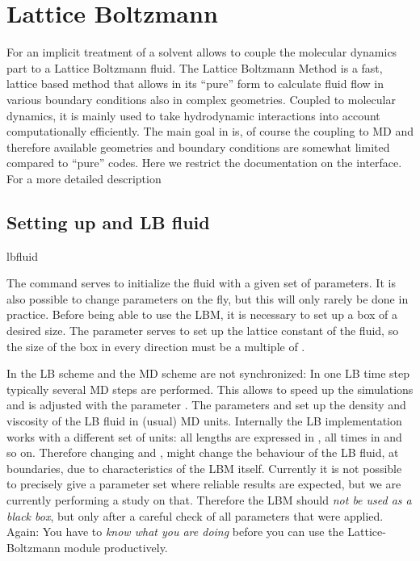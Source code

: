 \chapter{Lattice Boltzmann}
\label{sec:lb}
For an implicit treatment of a solvent \es allows to couple the molecular dynamics 
part to a Lattice Boltzmann fluid. The Lattice Boltzmann Method is a fast, lattice 
based method that allows in its ``pure'' form to calculate fluid flow in various boundary
conditions also in complex geometries. Coupled to molecular dynamics, it is mainly used to 
take hydrodynamic interactions into account computationally efficiently. The main
goal in \es is, of course the coupling to MD and therefore available geometries and
boundary conditions are somewhat limited compared to ``pure'' codes. 
Here we restrict the documentation on the interface. For a more detailed description


\section{Setting up and LB fluid}
\begin{essyntax}
  lbfluid
  \begin{features}
  \end{features}
\end{essyntax}
The  command serves to initialize the fluid with a given set
of parameters. It is also possible to change parameters on the fly, but this will
only rarely be done in practice. Before being able to use the LBM, it is necessary
to set up a box of a desired size. The parameter  serves to set up
the lattice constant of the fluid, so the size of the box in every direction must be a
multiple of . 

In \es the LB scheme and the MD scheme are not synchronized: In one
LB time step typically several MD steps are performed. This allows to speed
up the simulations and is adjusted with the parameter .
The parameters  and  set up the
density and viscosity of the LB fluid in (usual) MD units.
Internally the LB implementation works with a different set of units:
all lengths are expressed in , all times in  and so on.
Therefore changing   and , might change the behaviour 
of the LB fluid, \eg at boundaries, due to characteristics of the LBM
itself. Currently it is not possible to precisely give a parameter set
where reliable results are expected, but we are currently performing 
a study on that. Therefore the LBM should \emph{not be used as a black box}, but
only after a careful check of all parameters that were applied. Again: 
You have to \emph{know what you are doing} before you can use the Lattice-Boltzmann
module productively. 

